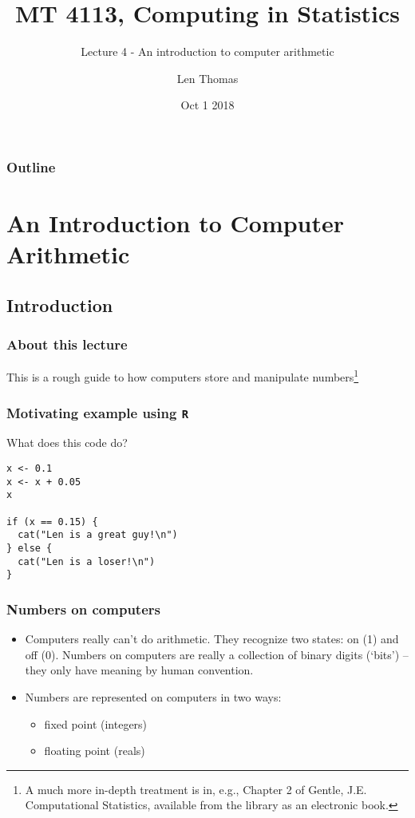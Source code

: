 \documentclass[11pt,a4paper]{article}
\title[MT4113]{MT 4113, Computing in Statistics}
\subtitle{Lecture 4 - An introduction to computer arithmetic}
\author[Lecture 4]{Len Thomas}
\date[1/10/2018] {Oct 1 2018}
\begin{document}
\begin{frame}
  \titlepage
\end{frame}


 {
\begin{frame}
  \frametitle{Outline}
	\tableofcontents
\end{frame}
}


\section{An Introduction to Computer Arithmetic}

\subsection{Introduction}

\begin{frame}
	\frametitle{About this lecture}

This is a rough guide to how computers store and manipulate numbers\footnote{A much more
in-depth treatment is in, e.g., Chapter 2 of Gentle, J.E. Computational Statistics, available from the library as an electronic book.}
\end{frame}

\begin{frame}[fragile]
	\frametitle{Motivating example using \texttt{R}}

What does this code do?

\begin{verbatim}
x <- 0.1
x <- x + 0.05
x

if (x == 0.15) {
  cat("Len is a great guy!\n") 
} else {
  cat("Len is a loser!\n")
}
\end{verbatim}

\end{frame}

\begin{frame}
	\frametitle{Numbers on computers}

	\begin{itemize}
		\item Computers really can't do arithmetic.  They recognize two states: on (1) and off (0).  Numbers on computers are really a collection of binary digits (`bits') -- they only have meaning by human convention.
		
		\item Numbers are represented on computers in two ways:
		\begin{itemize}
      \item fixed point (integers)
	    \item floating point (reals)
		\end{itemize}
	\end{itemize}

\end{frame}
\end{document}
